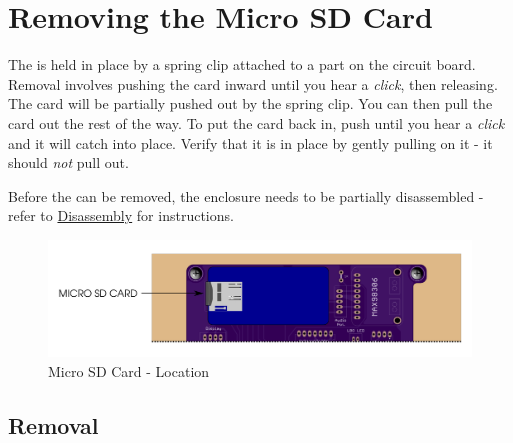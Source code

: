 \chapter{Removing the Micro SD Card} \label{Removing SD Card}


The  is held in place by a spring clip attached to a part on the circuit
board.  Removal involves pushing the card inward until you hear a
\textit{click}, then releasing.  The card will be partially pushed out by the
spring clip.  You can then pull the card out the rest of the way.  To put the
card back in, push until you hear a \textit{click} and it will catch into place.
Verify that it is in place by gently pulling on it - it should \textit{not} pull
out.

\par\medskip

Before the  can be removed, the enclosure needs to be partially
disassembled - refer to \hyperref[Disassembly]{Disassembly} for instructions.


\begin{figure}[H]
\centering
  \includegraphics{images/micro_sd_card.png}
\caption{Micro SD Card - Location}
\end{figure}

\pagebreak
\section{Removal} \label{SD Removal}

